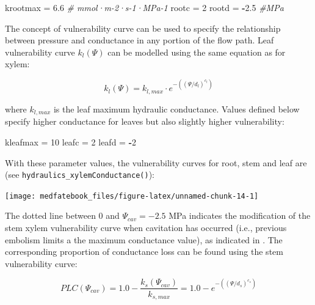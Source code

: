 \documentclass[]{book}
\newenvironment{Shaded}{\begin{snugshade}}{\end{snugshade}}
\newcommand{\DecValTok}[1]{\textcolor[rgb]{0.00,0.00,0.81}{#1}}
\newcommand{\FloatTok}[1]{\textcolor[rgb]{0.00,0.00,0.81}{#1}}
\newcommand{\StringTok}[1]{\textcolor[rgb]{0.31,0.60,0.02}{#1}}
\newcommand{\CommentTok}[1]{\textcolor[rgb]{0.56,0.35,0.01}{\textit{#1}}}
\newcommand{\OperatorTok}[1]{\textcolor[rgb]{0.81,0.36,0.00}{\textbf{#1}}}
\newcommand{\NormalTok}[1]{#1}
\begin{document}
\begin{Shaded}
\begin{Highlighting}[]
\NormalTok{krootmax =}\StringTok{ }\FloatTok{6.6} \CommentTok{# mmol·m-2·s-1·MPa-1}
\NormalTok{rootc =}\StringTok{ }\DecValTok{2}
\NormalTok{rootd =}\StringTok{ }\OperatorTok{-}\FloatTok{2.5} \CommentTok{#MPa}
\end{Highlighting}
\end{Shaded}

The concept of vulnerability curve can be used to specify the
relationship between pressure and conductance in any portion of the flow
path. Leaf vulnerability curve \(k_l(\Psi)\) can be modelled using the
same equation as for xylem:

\begin{equation}
k_l(\Psi) = k_{l,max}\cdot e^{-((\Psi/d_l)^{c_l})}
\label{eq:leafvulnerability}
\end{equation}

where \(k_{l,max}\) is the leaf maximum hydraulic conductance. Values
defined below specify higher conductance for leaves but also slightly
higher vulnerability:

\begin{Shaded}
\begin{Highlighting}[]
\NormalTok{kleafmax =}\StringTok{ }\DecValTok{10}
\NormalTok{leafc =}\StringTok{ }\DecValTok{2}
\NormalTok{leafd =}\StringTok{ }\OperatorTok{-}\DecValTok{2}
\end{Highlighting}
\end{Shaded}

With these parameter values, the vulnerability curves for root, stem and
leaf are (see \texttt{hydraulics\_xylemConductance()}):

\begin{center}\texttt{[image: medfatebook\_files/figure-latex/unnamed-chunk-14-1]} \end{center}

The dotted line between 0 and \(\Psi_{cav} = -2.5\) MPa indicates the
modification of the stem xylem vulnerability curve when cavitation has
occurred (i.e., previous embolism limits a the maximum conductance
value), as indicated in \citet{Sperry2016}. The corresponding proportion
of conductance loss can be found using the stem vulnerability curve:

\begin{equation}
PLC(\Psi_{cav}) = 1.0 - \frac{k_s(\Psi_{cav})}{k_{s,max}} = 1.0 - e^{-((\Psi/{d_s})^{c_s})}
\end{equation}
\end{document}
